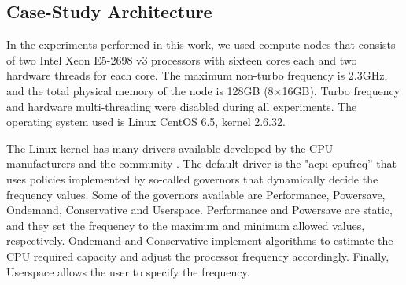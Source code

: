 

\subsection{Case-Study Architecture} \label{sec:casestudyarchitecture}
In the experiments performed in this work, we used compute nodes that consists of two Intel Xeon E5-2698 v3 processors with sixteen cores each and two hardware threads for each core. The maximum non-turbo frequency is 2.3GHz, and the total physical memory of the node is 128GB (8$\times$16GB). Turbo frequency and hardware multi-threading were disabled during all experiments. The operating system used is Linux CentOS 6.5, kernel 2.6.32.

The Linux kernel has many drivers available developed by the CPU manufacturers and the community \cite{Brown2005}. The default driver is the "acpi-cpufreq'' that uses policies implemented by so-called governors that dynamically decide the frequency values. Some of the governors available are Performance, Powersave, Ondemand, Conservative and Userspace. Performance and Powersave are static, and they set the frequency to the maximum and minimum allowed values, respectively. Ondemand and Conservative implement algorithms to estimate the CPU required capacity and adjust the processor frequency accordingly. Finally, Userspace allows the user to specify the frequency.


